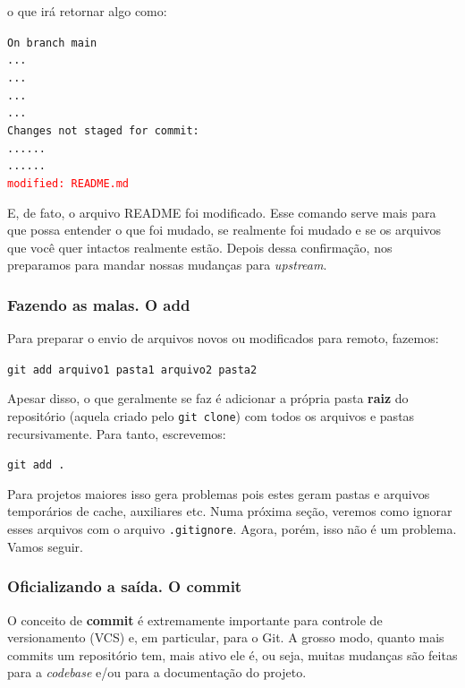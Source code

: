 \documentclass{article}
\begin{document}
  o que irá retornar algo como: 

  \vspace{1ex}
  \texttt{On branch main\\
  ...\\
  ...\\
  ...\\
  ...\\
  Changes not staged for commit:\\
  ......\\
  ......\\
  \textcolor{red}{modified:   README.md}}
  \vspace{1ex}

  E, de fato, o arquivo README foi modificado. Esse comando serve mais para que possa entender o que foi mudado, se realmente foi 
  mudado e se os arquivos que você quer intactos realmente estão. Depois dessa confirmação, nos preparamos para mandar nossas
  mudanças para \textit{upstream}. 
  
  \subsubsection{Fazendo as malas. O add}

  Para preparar o envio de arquivos novos ou modificados para remoto, fazemos: 
  
  \vspace{1ex}
  \texttt{git add arquivo1 pasta1 arquivo2 pasta2}
  \vspace{1ex}
  
  Apesar disso, o que geralmente se faz é adicionar a própria pasta \textbf{raiz} do repositório (aquela criado pelo \texttt{git clone})
  com todos os arquivos e pastas recursivamente. Para tanto, escrevemos: 

  \vspace{1ex}
  \texttt{git add .}
  \vspace{1ex}

  Para projetos maiores isso gera problemas pois estes geram pastas e arquivos temporários de cache, auxiliares etc. Numa próxima
  seção, veremos como ignorar esses arquivos com o arquivo \texttt{.gitignore}. Agora, porém, isso não é um problema. 
  Vamos seguir. 

  \subsubsection{Oficializando a saída. O commit}

  O conceito de \textbf{commit} é extremamente importante para controle de versionamento (VCS) e, em particular, para o Git. 
  A grosso modo, quanto mais commits um repositório tem, mais ativo ele é, ou seja, muitas mudanças são feitas para a \textit{codebase}
  e/ou para a documentação do projeto.
\end{document}
